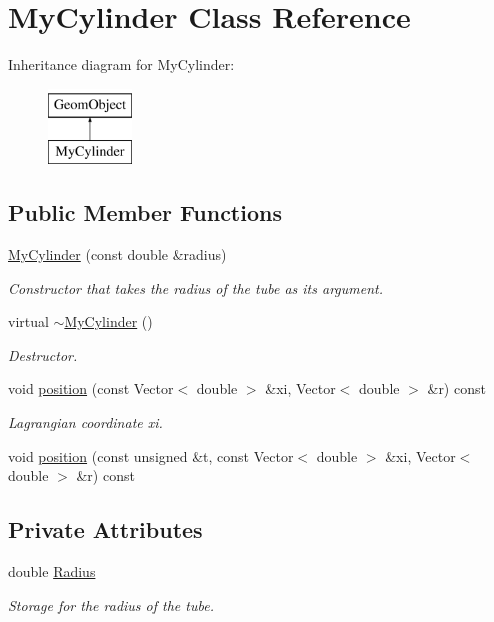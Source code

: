 \hypertarget{classMyCylinder}{}\section{My\+Cylinder Class Reference}
\label{classMyCylinder}
Inheritance diagram for My\+Cylinder\+:\begin{figure}[H]
\begin{center}
\leavevmode
\includegraphics[height=2.000000cm]{classMyCylinder}
\end{center}
\end{figure}
\subsection*{Public Member Functions}
\begin{DoxyCompactItemize}
\item 
\hyperlink{classMyCylinder_ab4794e9b1b43d02e62cfe660b902e469}{My\+Cylinder} (const double \&radius)
\begin{DoxyCompactList}\small\item\em Constructor that takes the radius of the tube as its argument. \end{DoxyCompactList}\item 
virtual \hyperlink{classMyCylinder_ab886e268e53bd295cc2d220a96e93bd9}{$\sim$\+My\+Cylinder} ()
\begin{DoxyCompactList}\small\item\em Destructor. \end{DoxyCompactList}\item 
void \hyperlink{classMyCylinder_add84f8717aa286d627ae9175e0c27d4a}{position} (const Vector$<$ double $>$ \&xi, Vector$<$ double $>$ \&r) const
\begin{DoxyCompactList}\small\item\em Lagrangian coordinate xi. \end{DoxyCompactList}\item 
void \hyperlink{classMyCylinder_a6ba18b398d0626bd14d7cc8c5873b8a2}{position} (const unsigned \&t, const Vector$<$ double $>$ \&xi, Vector$<$ double $>$ \&r) const
\end{DoxyCompactItemize}
\subsection*{Private Attributes}
\begin{DoxyCompactItemize}
\item 
double \hyperlink{classMyCylinder_a3151803ae1fbe1a9858fca37b0f0f20b}{Radius}
\begin{DoxyCompactList}\small\item\em Storage for the radius of the tube. \end{DoxyCompactList}\end{DoxyCompactItemize}


